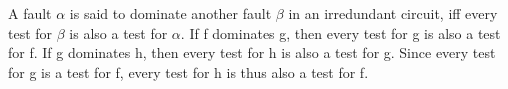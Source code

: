 A fault $\alpha$ is said to dominate another fault $\beta$ in an irredundant circuit, iff every test for $\beta$ is also a test for $\alpha$. If f dominates g, then every test for g is also a test for f. If g dominates h, then every test for h is also a test for g. Since every test for g is a test for f, every test for h is thus also a test for f.
